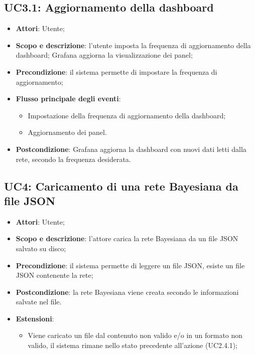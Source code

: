 \subsection{UC3.1: Aggiornamento della dashboard}
\begin{itemize}
	\item \textbf{Attori}: Utente;
	\item \textbf{Scopo e descrizione}: l'utente imposta la frequenza di aggiornamento della dashboard; Grafana aggiorna la visualizzazione dei panel;
	\item \textbf{Precondizione}: il sistema permette di impostare la frequenza di aggiornamento;
	\item \textbf{Flusso principale degli eventi}:
	\begin{itemize}
		\item Impostazione della frequenza di aggiornamento della dashboard;
		\item Aggiornamento dei panel.
	\end{itemize}
	\item \textbf{Postcondizione}: Grafana aggiorna la dashboard con nuovi dati letti dalla rete, secondo la frequenza desiderata.
\end{itemize}

\subsection{UC4: Caricamento di una rete Bayesiana da file JSON}
\hypertarget{UC9}{}
\begin{itemize}
	\item \textbf{Attori}: Utente;
	\item \textbf{Scopo e descrizione}: l'attore carica la rete Bayesiana da un file JSON salvato su disco;
	\item \textbf{Precondizione}: il sistema permette di leggere un file JSON, esiste un file JSON contenente la rete;
	\item \textbf{Postcondizione}: la rete Bayesiana viene creata secondo le informazioni salvate nel file.
	\item \textbf{Estensioni}:
	\begin{itemize}
		\item Viene caricato un file dal contenuto non valido e/o in un formato non valido, il sistema rimane nello stato precedente all'azione (UC2.4.1);
	\end{itemize}
\end{itemize}